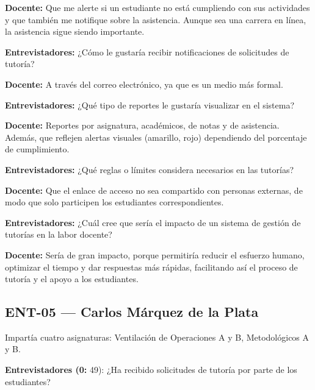 \noindent\textbf{Docente:} Que me alerte si un estudiante no está cumpliendo con sus actividades y que también me notifique sobre la asistencia. Aunque sea una carrera en línea, la asistencia sigue siendo importante.\par\smallskip

\noindent\textbf{Entrevistadores:} ¿Cómo le gustaría recibir notificaciones de solicitudes de tutoría?\par\smallskip

\noindent\textbf{Docente:} A través del correo electrónico, ya que es un medio más formal.\par\smallskip

\noindent\textbf{Entrevistadores:} ¿Qué tipo de reportes le gustaría visualizar en el sistema?\par\smallskip

\noindent\textbf{Docente:} Reportes por asignatura, académicos, de notas y de asistencia. Además, que reflejen alertas visuales (amarillo, rojo) dependiendo del porcentaje de cumplimiento.\par\smallskip

\noindent\textbf{Entrevistadores:} ¿Qué reglas o límites considera necesarios en las tutorías?\par\smallskip

\noindent\textbf{Docente:} Que el enlace de acceso no sea compartido con personas externas, de modo que solo participen los estudiantes correspondientes.\par\smallskip

\noindent\textbf{Entrevistadores:} ¿Cuál cree que sería el impacto de un sistema de gestión de tutorías en la labor docente?\par\smallskip

\noindent\textbf{Docente:} Sería de gran impacto, porque permitiría reducir el esfuerzo humano, optimizar el tiempo y dar respuestas más rápidas, facilitando así el proceso de tutoría y el apoyo a los estudiantes.\par\smallskip

\subsection{ENT-05 — Carlos Márquez de la Plata}
\label{transcripcion:ent05}

Impartía cuatro asignaturas: Ventilación de Operaciones A y B, Metodológicos A y B.\par\smallskip

\noindent\textbf{Entrevistadores (0:} 49): ¿Ha recibido solicitudes de tutoría por parte de los estudiantes?\par\smallskip


